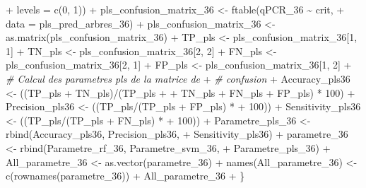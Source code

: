 \documentclass[
  11pt,
  french,
  a4paper,
  extrafontsizes,onecolumn,openright
  ]{memoir}
\newenvironment{Shaded}{\begin{snugshade}}{\end{snugshade}}
\newcommand{\AttributeTok}[1]{\textcolor[rgb]{0.77,0.63,0.00}{#1}}
\newcommand{\CommentTok}[1]{\textcolor[rgb]{0.56,0.35,0.01}{\textit{#1}}}
\newcommand{\DecValTok}[1]{\textcolor[rgb]{0.00,0.00,0.81}{#1}}
\newcommand{\FunctionTok}[1]{\textcolor[rgb]{0.00,0.00,0.00}{#1}}
\newcommand{\NormalTok}[1]{#1}
\newcommand{\OtherTok}[1]{\textcolor[rgb]{0.56,0.35,0.01}{#1}}
\newcommand{\SpecialCharTok}[1]{\textcolor[rgb]{0.00,0.00,0.00}{#1}}
\begin{document}
\begin{Shaded}
\begin{Highlighting}[]
\SpecialCharTok{+}         \AttributeTok{levels =} \FunctionTok{c}\NormalTok{(}\DecValTok{0}\NormalTok{, }\DecValTok{1}\NormalTok{))}
\SpecialCharTok{+}\NormalTok{     pls\_confusion\_matrix\_36 }\OtherTok{\textless{}{-}} \FunctionTok{ftable}\NormalTok{(qPCR\_36 }\SpecialCharTok{\textasciitilde{}}\NormalTok{ crit, }
\SpecialCharTok{+}         \AttributeTok{data =}\NormalTok{ pls\_pred\_arbres\_36)}
\SpecialCharTok{+}\NormalTok{     pls\_confusion\_matrix\_36 }\OtherTok{\textless{}{-}} \FunctionTok{as.matrix}\NormalTok{(pls\_confusion\_matrix\_36)}
\SpecialCharTok{+}\NormalTok{     TP\_pls }\OtherTok{\textless{}{-}}\NormalTok{ pls\_confusion\_matrix\_36[}\DecValTok{1}\NormalTok{, }\DecValTok{1}\NormalTok{]}
\SpecialCharTok{+}\NormalTok{     TN\_pls }\OtherTok{\textless{}{-}}\NormalTok{ pls\_confusion\_matrix\_36[}\DecValTok{2}\NormalTok{, }\DecValTok{2}\NormalTok{]}
\SpecialCharTok{+}\NormalTok{     FN\_pls }\OtherTok{\textless{}{-}}\NormalTok{ pls\_confusion\_matrix\_36[}\DecValTok{2}\NormalTok{, }\DecValTok{1}\NormalTok{]}
\SpecialCharTok{+}\NormalTok{     FP\_pls }\OtherTok{\textless{}{-}}\NormalTok{ pls\_confusion\_matrix\_36[}\DecValTok{1}\NormalTok{, }\DecValTok{2}\NormalTok{]}
\SpecialCharTok{+}     \CommentTok{\# Calcul des parametres pls de la matrice de}
\SpecialCharTok{+}     \CommentTok{\# confusion}
\SpecialCharTok{+}\NormalTok{     Accuracy\_pls36 }\OtherTok{\textless{}{-}}\NormalTok{ ((TP\_pls }\SpecialCharTok{+}\NormalTok{ TN\_pls)}\SpecialCharTok{/}\NormalTok{(TP\_pls }\SpecialCharTok{+} 
\SpecialCharTok{+}\NormalTok{         TN\_pls }\SpecialCharTok{+}\NormalTok{ FN\_pls }\SpecialCharTok{+}\NormalTok{ FP\_pls) }\SpecialCharTok{*} \DecValTok{100}\NormalTok{)}
\SpecialCharTok{+}\NormalTok{     Precision\_pls36 }\OtherTok{\textless{}{-}}\NormalTok{ ((TP\_pls}\SpecialCharTok{/}\NormalTok{(TP\_pls }\SpecialCharTok{+}\NormalTok{ FP\_pls) }\SpecialCharTok{*} 
\SpecialCharTok{+}         \DecValTok{100}\NormalTok{))}
\SpecialCharTok{+}\NormalTok{     Sensitivity\_pls36 }\OtherTok{\textless{}{-}}\NormalTok{ ((TP\_pls}\SpecialCharTok{/}\NormalTok{(TP\_pls }\SpecialCharTok{+}\NormalTok{ FN\_pls) }\SpecialCharTok{*} 
\SpecialCharTok{+}         \DecValTok{100}\NormalTok{))}
\SpecialCharTok{+}\NormalTok{     Parametre\_pls\_36 }\OtherTok{\textless{}{-}} \FunctionTok{rbind}\NormalTok{(Accuracy\_pls36, Precision\_pls36, }
\SpecialCharTok{+}\NormalTok{         Sensitivity\_pls36)}
\SpecialCharTok{+}\NormalTok{     parametre\_36 }\OtherTok{\textless{}{-}} \FunctionTok{rbind}\NormalTok{(Parametre\_rf\_36, Parametre\_svm\_36, }
\SpecialCharTok{+}\NormalTok{         Parametre\_pls\_36)}
\SpecialCharTok{+}\NormalTok{     All\_parametre\_36 }\OtherTok{\textless{}{-}} \FunctionTok{as.vector}\NormalTok{(parametre\_36)}
\SpecialCharTok{+}     \FunctionTok{names}\NormalTok{(All\_parametre\_36) }\OtherTok{\textless{}{-}} \FunctionTok{c}\NormalTok{(}\FunctionTok{rownames}\NormalTok{(parametre\_36))}
\SpecialCharTok{+}\NormalTok{     All\_parametre\_36}
\SpecialCharTok{+}\NormalTok{ \}}
\end{Highlighting}
\end{Shaded}
\end{document}
